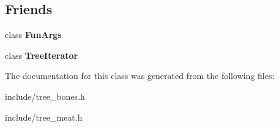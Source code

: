 \subsection*{Friends}
\begin{DoxyCompactItemize}
\item 
class {\bfseries Fun\+Args}\hypertarget{classTree_a667d4fbc407b7cce57e87064b934f905}{}\label{classTree_a667d4fbc407b7cce57e87064b934f905}

\item 
class {\bfseries Tree\+Iterator}\hypertarget{classTree_a925e5a7f5dc110e63f7062d0e6898af9}{}\label{classTree_a925e5a7f5dc110e63f7062d0e6898af9}

\end{DoxyCompactItemize}


The documentation for this class was generated from the following files\+:\begin{DoxyCompactItemize}
\item 
include/tree\+\_\+bones.\+h\item 
include/tree\+\_\+meat.\+h\end{DoxyCompactItemize}
